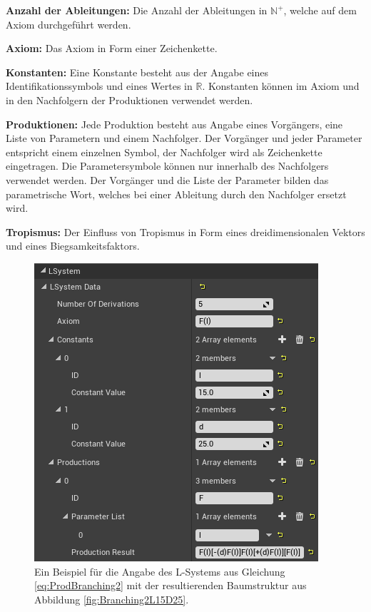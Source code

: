 \begin{description}
	\item \textbf{Anzahl der Ableitungen:} Die Anzahl der Ableitungen in $\mathbb{N}^+$, welche auf dem Axiom durchgeführt werden. \\
	
	\item \textbf{Axiom:} Das Axiom in Form einer Zeichenkette. \\
	
	\item \textbf{Konstanten:} Eine Konstante besteht aus der Angabe eines Identifikationssymbols und eines Wertes in $\mathbb{R}$. Konstanten können im Axiom und in den Nachfolgern der Produktionen verwendet werden.\\	
	
	\item \textbf{Produktionen:} Jede Produktion besteht aus Angabe eines Vorgängers, eine Liste von Parametern und einem Nachfolger. Der Vorgänger und jeder Parameter entspricht einem einzelnen Symbol, der Nachfolger wird als Zeichenkette eingetragen. Die Parametersymbole können nur innerhalb des Nachfolgers verwendet werden. Der Vorgänger und die Liste der Parameter bilden das parametrische Wort, welches bei einer Ableitung durch den Nachfolger ersetzt wird. \\
	
	\item \textbf{Tropismus:} Der Einfluss von Tropismus in Form eines dreidimensionalen Vektors und eines Biegsamkeitsfaktors.
\end{description}
\begin{figure} [hbtp]
	\centering
	\includegraphics[height=0.4\textheight]{images/LS_ExampleUE4UI.png}
	\caption{Ein Beispiel für die Angabe des L-Systems aus Gleichung \ref{eq:ProdBranching2} mit der resultierenden Baumstruktur aus Abbildung \ref{fig:Branching2L15D25}.}
	\label{fig:LS_ExampleUE4UI}
\end{figure}
